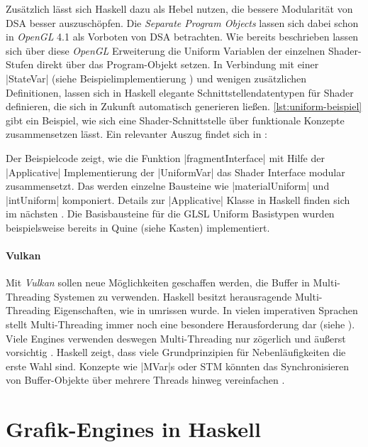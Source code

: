 Zusätzlich lässt sich Haskell dazu als Hebel nutzen, die bessere Modularität von \ac{DSA} besser auszuschöpfen. Die \textit{Separate Program Objects} lassen sich dabei schon in \textit{OpenGL} 4.1 als Vorboten von \ac{DSA} betrachten. Wie bereits beschrieben lassen sich über diese \textit{OpenGL} Erweiterung die Uniform Variablen der einzelnen Shader-Stufen direkt über das Program-Objekt setzen. In Verbindung mit einer |StateVar| (siehe Beispielimplementierung ) und wenigen zusätzlichen Definitionen, lassen sich in Haskell elegante Schnittstellendatentypen für Shader definieren, die sich in Zukunft automatisch generieren ließen. \ref{lst:uniform-beispiel} gibt ein Beispiel, wie sich eine Shader-Schnittstelle über funktionale Konzepte zusammensetzen lässt. Ein relevanter Auszug findet sich in :

\clearpage
{}
\endgroup

Der Beispielcode zeigt, wie die Funktion |fragmentInterface| mit Hilfe der |Applicative| Implementierung der |UniformVar| das Shader Interface modular zusammensetzt. Das werden einzelne Bausteine wie |materialUniform| und |intUniform| komponiert. Details zur |Applicative| Klasse in Haskell finden sich im nächsten . Die Basisbausteine für die GLSL Uniform Basistypen wurden beispielsweise bereits in Quine (siehe Kasten) implementiert.


\paragraph{Vulkan} Mit \textit{Vulkan} sollen neue Möglichkeiten geschaffen werden, die Buffer in Multi-Threading Systemen zu verwenden. Haskell besitzt herausragende Multi-Threading Eigenschaften, wie in  umrissen wurde. In vielen imperativen Sprachen stellt Multi-Threading immer noch eine besondere Herausforderung dar (siehe ). Viele Engines verwenden deswegen Multi-Threading nur zögerlich und äußerst vorsichtig \parencite[Seite 42]{Sweeney2006}. Haskell zeigt, dass viele Grundprinzipien für Nebenläufigkeiten die erste Wahl sind. Konzepte wie |MVar|s oder \ac{STM} könnten das Synchronisieren von Buffer-Objekte über mehrere Threads hinweg vereinfachen \parencite{Marlow2012}.

\section{Grafik-Engines in Haskell}

